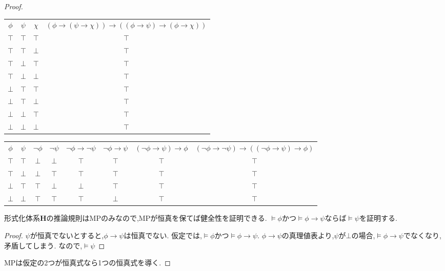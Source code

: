 \begin{proof}
\begin{center}
\begin{tabular}{|c c c||c|}
\hline
$\phi$ & $\psi$ & $\chi$ & $(\phi \to (\psi \to \chi)) \to ((\phi \to \psi) \to (\phi \to \chi))$ \\
\hhline{|===#=|}
$\top$ & $\top$ & $\top$ & $\top$ \\
\hline
$\top$ & $\top$ & $\bot$ & $\top$ \\
\hline
$\top$ & $\bot$ & $\top$ & $\top$ \\
\hline
$\top$ & $\bot$ & $\bot$ & $\top$ \\
\hline
$\bot$ & $\top$ & $\top$ & $\top$ \\
\hline
$\bot$ & $\top$ & $\bot$ & $\top$ \\
\hline
$\bot$ & $\bot$ & $\top$ & $\top$ \\
\hline
$\bot$ & $\bot$ & $\bot$ & $\top$ \\
\hline
\end{tabular}
\end{center}

\begin{center}
\begin{tabular}{|c c||c|c||c|c|c||c|}
\hline
$\phi$ & $\psi$ & $\lnot \phi$ & $\lnot \psi$ & $\lnot \phi \to \lnot \psi$ & $\lnot \phi \to \psi$ & $(\lnot \phi \to \psi) \to \phi$ & $(\lnot \phi \to \lnot \psi) \to ((\lnot \phi \to \psi) \to \phi)$ \\
\hhline{|==#=|=#=|=|=#=|}
$\top$ & $\top$ & $\bot$ & $\bot$ & $\top$ & $\top$ & $\top$ & $\top$ \\
\hline
$\top$ & $\bot$ & $\bot$ & $\top$ & $\top$ & $\top$ & $\top$ & $\top$ \\
\hline
$\bot$ & $\top$ & $\top$ & $\bot$ & $\bot$ & $\top$ & $\top$ & $\top$ \\
\hline
$\bot$ & $\bot$ & $\top$ & $\top$ & $\top$ & $\bot$ & $\top$ & $\top$ \\
\hline
\end{tabular}
\end{center}

形式化体系$\bm{H}$の推論規則はMPのみなので,MPが恒真を保てば健全性を証明できる.
$\models \phi$かつ$\models \phi \to \psi$ならば$\models \psi$を証明する.
\begin{proof}
 $\psi$が恒真でないとすると,$\phi \to \psi$は恒真でない.
 仮定では,$\models \phi$かつ$\models \phi \to \psi$.
 $\phi \to \psi$の真理値表より,$\psi$が$\bot$の場合,$\models \phi \to \psi$でなくなり,矛盾してしまう.
 なので,$\models \psi$
\end{proof}
MPは仮定の2つが恒真式なら1つの恒真式を導く.
\end{proof}

